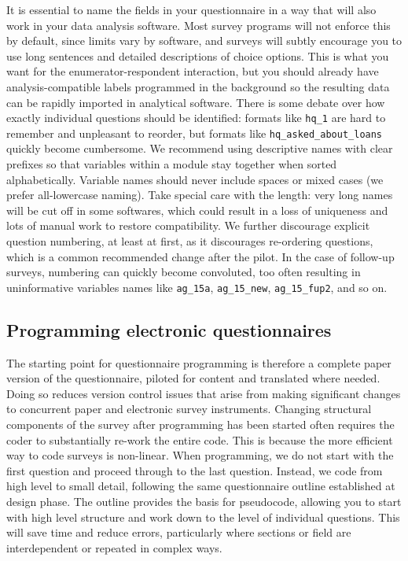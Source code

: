 It is essential to name the fields in your questionnaire
in a way that will also work in your data analysis software.
Most survey programs will not enforce this by default,
since limits vary by software,
and surveys will subtly encourage you to use long sentences
and detailed descriptions of choice options.
This is what you want for the enumerator-respondent interaction,
but you should already have analysis-compatible labels programmed in the background
so the resulting data can be rapidly imported in analytical software.
There is some debate over how exactly individual questions should be identified:
formats like \texttt{hq\_1} are hard to remember and unpleasant to reorder,
but formats like \texttt{hq\_asked\_about\_loans} quickly become cumbersome.
We recommend using descriptive names with clear prefixes so that variables
within a module stay together when sorted alphabetically.
Variable names should never include spaces or mixed cases
(we prefer all-lowercase naming).
Take special care with the length: very long names will be cut off in some softwares,
which could result in a loss of uniqueness and lots of manual work to restore compatibility.
We further discourage explicit question numbering,
at least at first, as it discourages re-ordering questions,
which is a common recommended change after the pilot.
In the case of follow-up surveys, numbering can quickly become convoluted,
too often resulting in uninformative variables names like
\texttt{ag\_15a}, \texttt{ag\_15\_new}, \texttt{ag\_15\_fup2}, and so on.

\subsection{Programming electronic questionnaires}

The starting point for questionnaire programming is therefore a complete paper version of the questionnaire,
piloted for content and translated where needed.
Doing so reduces version control issues that arise from making significant changes
to concurrent paper and electronic survey instruments.
Changing structural components of the survey after programming has been started
often requires the coder to substantially re-work the entire code.
This is because the more efficient way to code surveys is non-linear.
When programming, we do not start with the first question and proceed through to the last question.
Instead, we code from high level to small detail,
following the same questionnaire outline established at design phase.
The outline provides the basis for pseudocode,
allowing you to start with high level structure and work down to the level of individual questions.
This will save time and reduce errors,
particularly where sections or field are interdependent or repeated in complex ways.

